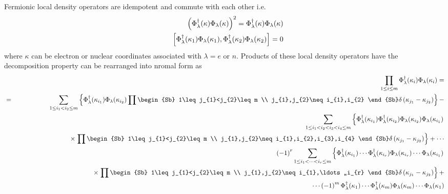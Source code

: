 Fermionic local density operators are idempotent and commute with each other
i.e. 
\begin{eqnarray}
&&\left( \Phi _{\lambda }^{\dagger }(\kappa )\Phi _{\lambda }(\kappa
)\right) ^{2}=\Phi _{\lambda }^{\dagger }(\kappa )\Phi _{\lambda }(\kappa ) 
\nonumber \\
&&\left[ \Phi _{{\cal \lambda }}^{\dagger }(\kappa _{1})\Phi _{{\cal \lambda 
}}(\kappa _{1}),\Phi _{{\cal \lambda }}^{\dagger }(\kappa _{2})\Phi _{{\cal %
\lambda }}(\kappa _{2})\right] =0
\end{eqnarray}%
where $\kappa $ can be electron or nuclear coordinates associated with $%
\lambda =e$ or $n$. Products of these local density operators have the
decomposition property can be rearranged into nromal form as 
\begin{eqnarray}
&&\prod_{1\leq i\leq m}\Phi _{{\cal \lambda }}^{\dagger }(\kappa _{i})\Phi _{%
{\cal \lambda }}(\kappa _{i})=  \nonumber \\
&=&\sum_{1\leq i_{1}<i_{2}\leq m}\left\{ \Phi _{{\cal \lambda }}^{\dagger
}(\kappa _{i_{1}})\Phi _{{\cal \lambda }}(\kappa _{i_{2}})\prod\begin{Sb} %
1\leq j_{1}<j_{2}\leq m  \\ j_{1},j_{2}\neq i_{1},i_{2}  \end{Sb}  \delta
\left( \kappa _{j_{1}}-\kappa _{j_{2}}\right) \right\} -  \nonumber \\
&&\sum_{1\leq i_{1}<i_{2}<i_{3}<i_{4}\leq m}\left\{ \Phi _{{\cal \lambda }%
}^{\dagger }(\kappa _{i_{1}})\Phi _{{\cal \lambda }}^{\dagger }(\kappa
_{i_{2}})\Phi _{{\cal \lambda }}(\kappa _{i_{2}})\Phi _{{\cal \lambda }%
}(\kappa _{i_{1}})\right.  \nonumber \\
&&\qquad \qquad \qquad \qquad \times \left. \prod\begin{Sb} 1\leq
j_{1}<j_{2}\leq m  \\ j_{1},j_{2}\neq i_{1},i_{2},i_{3},i_{4}  \end{Sb} 
\delta \left( \kappa _{j_{1}}-\kappa _{j_{2}}\right) \right\} +\cdots 
\nonumber \\
&&\left( -1\right) ^{r}\sum_{1\leq i_{1}<\cdots <i_{r}\leq m}\left\{ \Phi _{%
{\cal \lambda }}^{\dagger }(\kappa _{i_{1}})\cdots \Phi _{{\cal \lambda }%
}^{\dagger }(\kappa _{i_{r}})\Phi _{{\cal \lambda }}(\kappa _{i_{r}})\cdots
\Phi _{{\cal \lambda }}(\kappa _{i_{1}})\right.  \nonumber \\
&&\qquad \qquad \qquad \times \left. \prod\begin{Sb} 1\leq j_{1}<j_{2}\leq m 
\\ j_{1},j_{2}\neq i_{1},\ldots ,,i_{r}  \end{Sb}  \delta \left( \kappa
_{j_{1}}-\kappa _{j_{2}}\right) \right\} +  \nonumber \\
&&\qquad \qquad \cdots \left( -1\right) ^{m}\Phi _{{\cal \lambda }}^{\dagger
}(\kappa _{1})\cdots \Phi _{{\cal \lambda }}^{\dagger }(\kappa _{m})\Phi _{%
{\cal \lambda }}(\kappa _{m})\cdots \Phi _{{\cal \lambda }}(\kappa _{1})
\label{decomp}
\end{eqnarray}%
